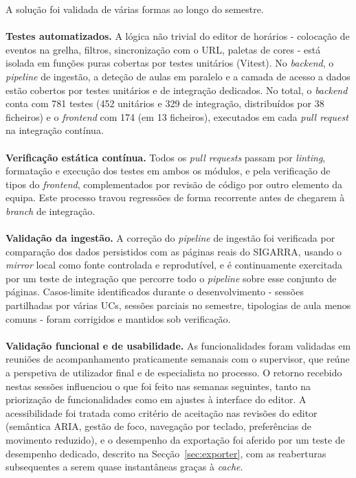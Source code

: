 \documentclass[10pt]{article}
\begin{document}
    A solução foi validada de várias formas ao longo do semestre.
    \\\\
    \textbf{Testes automatizados.} A lógica não trivial do editor de horários - colocação de eventos na grelha, filtros, sincronização com o URL, paletas de cores - está isolada em funções puras cobertas por testes unitários (Vitest). No \emph{backend}, o \emph{pipeline} de ingestão, a deteção de aulas em paralelo e a camada de acesso a dados estão cobertos por testes unitários e de integração dedicados. No total, o \emph{backend} conta com 781 testes (452 unitários e 329 de integração, distribuídos por 38 ficheiros) e o \emph{frontend} com 174 (em 13 ficheiros), executados em cada \emph{pull request} na integração contínua.
    \\\\
    \textbf{Verificação estática contínua.} Todos os \emph{pull requests} passam por \emph{linting}, formatação e execução dos testes em ambos os módulos, e pela verificação de tipos do \emph{frontend}, complementados por revisão de código por outro elemento da equipa. Este processo travou regressões de forma recorrente antes de chegarem à \emph{branch} de integração.
    \\\\
    \textbf{Validação da ingestão.} A correção do \emph{pipeline} de ingestão foi verificada por comparação dos dados persistidos com as páginas reais do SIGARRA, usando o \emph{mirror} local como fonte controlada e reprodutível, e é continuamente exercitada por um teste de integração que percorre todo o \emph{pipeline} sobre esse conjunto de páginas. Casos-limite identificados durante o desenvolvimento - sessões partilhadas por várias UCs, sessões parciais no semestre, tipologias de aula menos comuns - foram corrigidos e mantidos sob verificação.
    \\\\
    \textbf{Validação funcional e de usabilidade.} As funcionalidades foram validadas em reuniões de acompanhamento praticamente semanais com o supervisor, que reúne a perspetiva de utilizador final e de especialista no processo. O retorno recebido nestas sessões influenciou o que foi feito nas semanas seguintes, tanto na priorização de funcionalidades como em ajustes à interface do editor.
    A acessibilidade foi tratada como critério de aceitação nas revisões do editor (semântica ARIA, gestão de foco, navegação por teclado, preferências de movimento reduzido), e o desempenho da exportação foi aferido por um teste de desempenho dedicado, descrito na Secção~\ref{sec:exporter}, com as reaberturas subsequentes a serem quase instantâneas graças à \emph{cache}.
\end{document}

